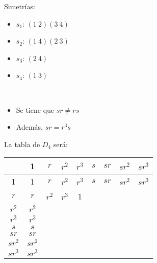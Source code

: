 Simetrías: %
\begin{itemize}
    \item $s_1$: $(1\ 2)(3\ 4)$
    \item $s_2$: $(1\ 4)(2\ 3)$
    \item $s_3$: $(2\ 4)$
    \item $s_4$: $(1\ 3)$
\end{itemize}

\begin{observacion}\
    \begin{itemize}
        \item Se tiene que $sr \neq rs$
        \item Además, $sr=r^3s$
    \end{itemize}
\end{observacion}

La tabla de $D_4$ será:

\begin{center} %
    \begin{tabular}{c|c|c|c|c|c|c|c|c|} %
        & 1 & $r$ & $r^2$ & $r^3$ & $s$ & $sr$ & $sr^2$ & $sr^3$\\
        \hline
        1 & 1 & $r$  & $r^2$ & $r^3$ & $s$ & $sr$ & $sr^2$ & $sr^3$\\
        \hline
        $r$ & $r$ & $r^2$ & $r^3$ & 1\\
        \hline
        $r^2$ & $r^2$\\
        \hline
        $r^3$ & $r^3$\\
        \hline
        $s$ & $s$\\
        \hline
        $sr$ & $sr$\\
        \hline
        $sr^2$ & $sr^2$\\
        \hline
        $sr^3$ & $sr^3$\\
        \hline
    \end{tabular}
\end{center}

